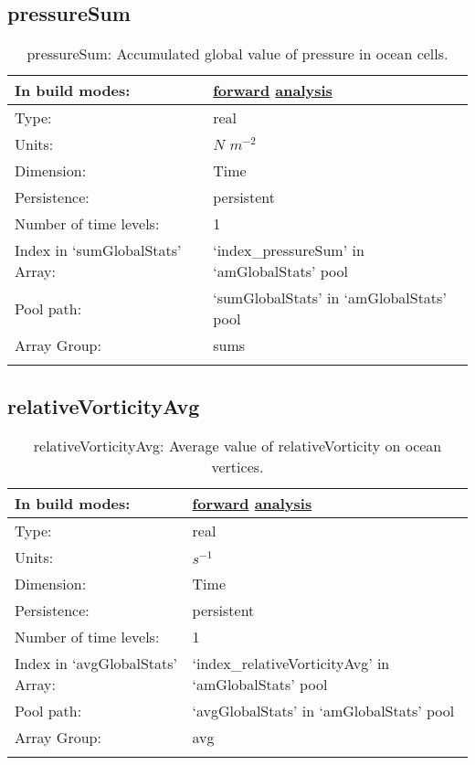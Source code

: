 \subsection[pressureSum]{pressureSum}
\label{subsec:var_sec_amGlobalStats_pressureSum}
\begin{center}
\begin{longtable}{| p{2.0in} | p{4.0in} |}
        \hline 
        In build modes: & \hyperref[subsec:forward_var_tab_amGlobalStats]{forward} \hyperref[subsec:analysis_var_tab_amGlobalStats]{analysis} \\
        \hline 
        Type: & real \\
        \hline 
        Units: & $N$ $m^{-2}$ \\
        \hline 
        Dimension: & Time \\
        \hline 
        Persistence: & persistent \\
        \hline 
        Number of time levels: & 1 \\
        \hline 
		 Index in `sumGlobalStats' Array: & `index\_pressureSum' in `amGlobalStats' pool \\
		 \hline 
            Pool path: & `sumGlobalStats' in `amGlobalStats' pool \\
		 \hline 
		 Array Group: & sums \\
		 \hline 
    \caption{pressureSum: Accumulated global value of pressure in ocean cells.}
\end{longtable}
\end{center}
\subsection[relativeVorticityAvg]{relativeVorticityAvg}
\label{subsec:var_sec_amGlobalStats_relativeVorticityAvg}
\begin{center}
\begin{longtable}{| p{2.0in} | p{4.0in} |}
        \hline 
        In build modes: & \hyperref[subsec:forward_var_tab_amGlobalStats]{forward} \hyperref[subsec:analysis_var_tab_amGlobalStats]{analysis} \\
        \hline 
        Type: & real \\
        \hline 
        Units: & $s^{-1}$ \\
        \hline 
        Dimension: & Time \\
        \hline 
        Persistence: & persistent \\
        \hline 
        Number of time levels: & 1 \\
        \hline 
		 Index in `avgGlobalStats' Array: & `index\_relativeVorticityAvg' in `amGlobalStats' pool \\
		 \hline 
            Pool path: & `avgGlobalStats' in `amGlobalStats' pool \\
		 \hline 
		 Array Group: & avg \\
		 \hline 
    \caption{relativeVorticityAvg: Average value of relativeVorticity on ocean vertices.}
\end{longtable}
\end{center}
